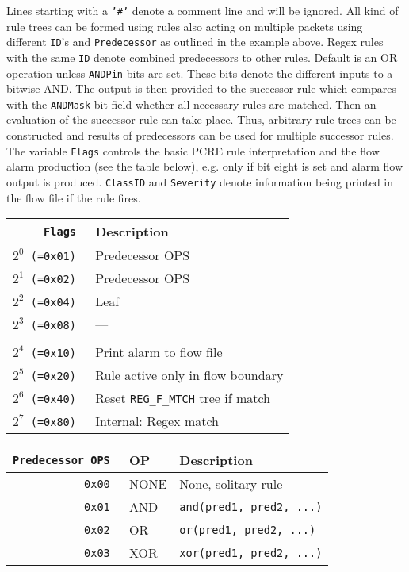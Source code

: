 \documentclass[documentation]{subfiles}
\begin{document}
Lines starting with a {\tt '\#'} denote a comment line and will be ignored.
All kind of rule trees can be formed using rules also acting on multiple packets using different {\tt ID}'s and {\tt Predecessor} as outlined in the example above.
Regex rules with the same {\tt ID} denote combined predecessors to other rules. Default is an OR operation unless {\tt ANDPin} bits are set. These bits denote the different inputs to a bitwise AND. The output is then provided
to the successor rule which compares with the {\tt ANDMask} bit field whether all necessary rules are matched.
Then an evaluation of the successor rule can take place. Thus, arbitrary rule trees can be constructed and results of
predecessors can be used for multiple successor rules. The variable {\tt Flags} controls the basic PCRE rule interpretation and the flow alarm production (see the table below), e.g. only if bit eight is set and alarm flow output is produced. {\tt ClassID} and {\tt Severity} denote information being printed in the flow file if the rule fires.

\begin{longtable}{>{\tt}rl}
    \toprule
    {\bf Flags} & {\bf Description}\\
    \midrule\endhead%
    $2^0$ (=0x01) & Predecessor OPS\\
    $2^1$ (=0x02) & Predecessor OPS\\
    $2^2$ (=0x04) & Leaf\\
    $2^3$ (=0x08) & --- \\
    \\
    $2^4$ (=0x10) & Print alarm to flow file\\
    $2^5$ (=0x20) & Rule active only in flow boundary\\
    $2^6$ (=0x40) & Reset {\tt REG\_F\_MTCH} tree if match\\
    $2^7$ (=0x80) & Internal: Regex match\\
    \bottomrule
\end{longtable}

\begin{longtable}{>{\tt}rll}
    \toprule
    {\bf Predecessor OPS} & {\bf OP} & {\bf Description}\\
    \midrule\endhead%
    0x00 & NONE & None, solitary rule\\
    0x01 & AND  & {\tt and(pred1, pred2, ...)}\\
    0x02 & OR   & {\tt or(pred1, pred2, ...)}\\
    0x03 & XOR  & {\tt xor(pred1, pred2, ...)}\\
    \bottomrule
\end{longtable}
\end{document}
